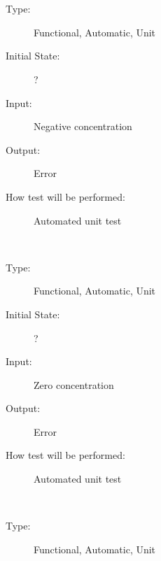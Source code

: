 \documentclass[12pt, titlepage]{article}
\newcounter{testnum} %
\begin{document}
\\
\begin{addmargin}[2em]{0em}
\\
\begin{addmargin}[2em]{0em}
\begin{description}
\item[Type:] Functional, Automatic, Unit
					
\item[Initial State:] ?
					
\item[Input:] Negative concentration
					
\item[Output:] Error
					
\item[How test will be performed:] Automated unit test\\
\end{description}
\end{addmargin}

\\
\begin{addmargin}[2em]{0em}
\begin{description}
\item[Type:] Functional, Automatic, Unit
					
\item[Initial State:] ?
					
\item[Input:] Zero concentration
					
\item[Output:] Error
					
\item[How test will be performed:] Automated unit test\\
\end{description}
\end{addmargin}

\\
\begin{addmargin}[2em]{0em}
\begin{description}
\item[Type:] Functional, Automatic, Unit
					

\end{description}
\end{addmargin}
\end{addmargin}
\end{document}
